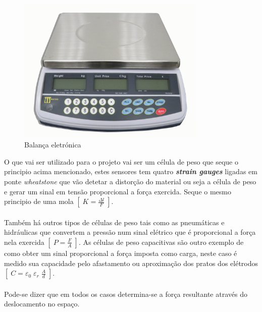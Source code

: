 \begin{figure}[H]
	\centering
	\includegraphics[height=7cm]{./image/PESTA/general/Scale_1.jpg}
	\caption{Balança eletrónica}
	\label{Sale}
\end{figure}
O que vai ser utilizado para o projeto vai ser um célula de peso que seque o principio acima mencionado, estes sensores tem quatro \textit{\textbf{strain gauges}} ligadas em ponte \textit{wheatstone} que vão detetar a distorção do material ou seja a célula de peso e gerar um sinal em tensão proporcional a força exercida. Seque o mesmo principio de uma mola $ [ \; K = \frac{\Delta l}{F} \; ] $.
\\
\\
Também há outros tipos de células de peso tais como as pneumáticas e hidráulicas que convertem a pressão num sinal elétrico que é proporcional a força nela exercida $ [ \; P = \frac{F}{A} \; ] $. As células de peso capacitivas são outro exemplo de como obter um sinal proporcional a força imposta como carga, neste caso é medido sua capacidade pelo afastamento ou aproximação dos pratos dos elétrodos $ [ \; C = \varepsilon_{0} \; \varepsilon_{r} \; \frac{A}{d} \; ] $.
\\
\\
Pode-se dizer que em todos os casos determina-se a força resultante através do deslocamento no espaço.
